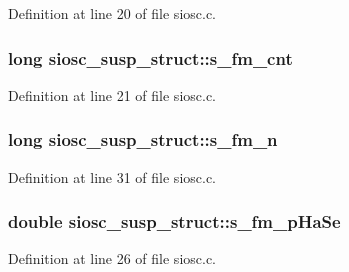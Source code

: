 Definition at line 20 of file siosc.\+c.

\subsubsection[{\texorpdfstring{s\+\_\+fm\+\_\+cnt}{s_fm_cnt}}]{\setlength{\rightskip}{0pt plus 5cm}long siosc\+\_\+susp\+\_\+struct\+::s\+\_\+fm\+\_\+cnt}\hypertarget{structsiosc__susp__struct_a2cf5991ccde920729514c66e49df44ef}{}\label{structsiosc__susp__struct_a2cf5991ccde920729514c66e49df44ef}


Definition at line 21 of file siosc.\+c.

\subsubsection[{\texorpdfstring{s\+\_\+fm\+\_\+n}{s_fm_n}}]{\setlength{\rightskip}{0pt plus 5cm}long siosc\+\_\+susp\+\_\+struct\+::s\+\_\+fm\+\_\+n}\hypertarget{structsiosc__susp__struct_acd630390822c58af2bf396c2da8811d4}{}\label{structsiosc__susp__struct_acd630390822c58af2bf396c2da8811d4}


Definition at line 31 of file siosc.\+c.

\subsubsection[{\texorpdfstring{s\+\_\+fm\+\_\+p\+Ha\+Se}{s_fm_pHaSe}}]{\setlength{\rightskip}{0pt plus 5cm}double siosc\+\_\+susp\+\_\+struct\+::s\+\_\+fm\+\_\+p\+Ha\+Se}\hypertarget{structsiosc__susp__struct_aba4464cacc02794d4f41122b3dc6fee3}{}\label{structsiosc__susp__struct_aba4464cacc02794d4f41122b3dc6fee3}


Definition at line 26 of file siosc.\+c.


